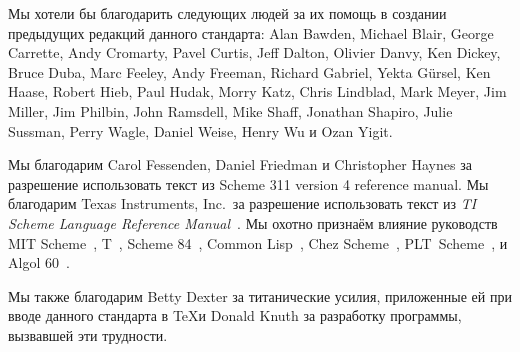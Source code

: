 Мы хотели бы благодарить следующих людей за их помощь в создании предыдущих редакций данного
стандарта: Alan Bawden, Michael Blair, George Carrette, Andy Cromarty, Pavel Curtis, Jeff
Dalton, Olivier Danvy, Ken Dickey, Bruce Duba, Marc Feeley, Andy Freeman, Richard Gabriel, Yekta
G\"ursel, Ken Haase, Robert Hieb, Paul Hudak, Morry Katz, Chris Lindblad, Mark Meyer, Jim
Miller, Jim Philbin, John Ramsdell, Mike Shaff, Jonathan Shapiro, Julie Sussman, Perry Wagle,
Daniel Weise, Henry Wu и Ozan Yigit.\vspace{4mm}

Мы благодарим Carol Fessenden, Daniel
Friedman и Christopher Haynes за разрешение использовать текст из Scheme 311
version 4 reference manual.  Мы благодарим Texas Instruments, Inc.~за разрешение
использовать текст из {\em TI Scheme Language Reference Manual}~\cite{TImanual85}.
Мы охотно признаём влияние руководств MIT Scheme~\cite{MITScheme},
T~\cite{Rees84}, Scheme 84~\cite{Scheme84}, Common Lisp~\cite{CLtL},
Chez Scheme~\cite{csug7}, PLT~Scheme~\cite{mzscheme352},
и Algol 60~\cite{Naur63}.\vspace{4mm}

\vest Мы также благодарим Betty Dexter за титанические усилия, приложенные ей при
вводе данного стандарта в \TeX и Donald Knuth за разработку программы,
вызвавшей эти трудности.\vspace{4mm}

